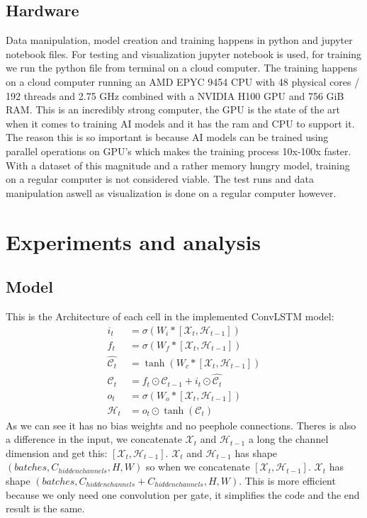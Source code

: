 \documentclass[a4paper,12pt]{article}
\begin{document}
\subsection{Hardware}
Data manipulation, model creation and training happens in python and jupyter notebook files. For testing and visualization jupyter notebook is used, for training we run the python file from terminal on a cloud computer.
The training happens on a cloud computer running an AMD EPYC 9454 CPU with 48 physical cores / 192 threads and 2.75 GHz combined with a NVIDIA H100 GPU and 756 GiB RAM. This is an incredibly strong computer, the GPU is the state of the art when it comes to training AI models and it has the ram and CPU to support it. The reason this is so important is because AI models can be trained using parallel operations on GPU's which makes the training process 10x-100x faster.
With a dataset of this magnitude and a rather memory hungry model, training on a regular computer is not considered viable. The test runs and data manipulation aswell as visualization is done on a regular computer however.
\section{Experiments and analysis}
\subsection{Model}
This is the Architecture of each cell in the implemented ConvLSTM model:
\begin{align}
  i_t &= \sigma(W_{i} * [\mathcal{X}_t, \mathcal{H}_{t-1}]) \\
  f_t &= \sigma(W_{f} * [\mathcal{X}_t, \mathcal{H}_{t-1}]) \\
  \hat{\mathcal{C}_t} &= \tanh(W_{c} * [\mathcal{X}_t, \mathcal{H}_{t-1}])\\
  \mathcal{C}_t &= f_t \odot \mathcal{C}_{t-1} + i_t \odot \hat{\mathcal{C}_t} \\
  o_t &= \sigma(W_{o} * [\mathcal{X}_t, \mathcal{H}_{t-1}]) \\
  \mathcal{H}_t &= o_t \odot \tanh(\mathcal{C}_t)
  \end{align}
  As we can see it has no bias weights and no peephole connections. 
  Theres is also a difference in the input, we concatenate $\mathcal{X}_t$ and $\mathcal{H}_{t-1}$ a long the channel dimension and get this: $[\mathcal{X}_t, \mathcal{H}_{t-1}]$. $\mathcal{X}_t$ and $\mathcal{H}_{t-1}$ has shape $(batches, C_{hidden channels}, H, W)$ so when we concatenate $[\mathcal{X}_t, \mathcal{H}_{t-1}]$. $\mathcal{X}_t$ has shape $(batches, C_{hidden channels}+C_{hidden channels}, H, W)$.
  This is more efficient because we only need one convolution per gate, it simplifies the code and the end result is the same. 
\end{document}
